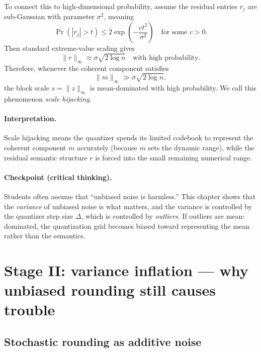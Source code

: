 To connect this to high-dimensional probability, assume the residual entries $r_j$
are sub-Gaussian with parameter $\sigma^2$, meaning
\begin{equation}
\Pr(|r_j|>t)\le 2\exp\!\left(-\frac{c t^2}{\sigma^2}\right)
\quad\text{for some }c>0.
\label{eq:subgauss_tail}
\end{equation}
Then standard extreme-value scaling gives
\begin{equation}
\|r\|_\infty \approx \sigma\sqrt{2\log n}
\quad\text{with high probability}.
\label{eq:residual_max_scale}
\end{equation}
Therefore, whenever the coherent component satisfies
\begin{equation}
\|m\|_\infty \gg \sigma\sqrt{2\log n},
\label{eq:hijack_condition}
\end{equation}
the block scale $s=\|z\|_\infty$ is mean-dominated with high probability.
We call this phenomenon \emph{scale hijacking}.

\paragraph{Interpretation.}
Scale hijacking means the quantizer spends its limited codebook to represent the
coherent component $m$ accurately (because $m$ sets the dynamic range), while the
residual semantic structure $r$ is forced into the small remaining numerical range.

\paragraph{Checkpoint (critical thinking).}
Students often assume that ``unbiased noise is harmless.'' This chapter shows that
the \emph{variance} of unbiased noise is what matters, and the variance is controlled
by the quantizer step size $\Delta$, which is controlled by \emph{outliers}. If
outliers are mean-dominated, the quantization grid becomes biased toward representing
the mean rather than the semantics.

\section{Stage II: variance inflation --- why unbiased rounding still causes trouble}

\subsection{Stochastic rounding as additive noise}

